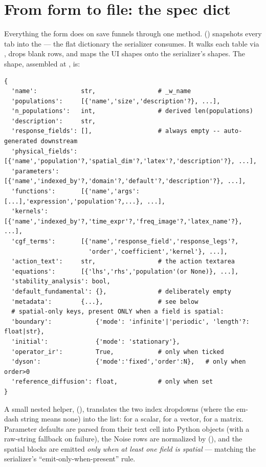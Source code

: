 \section{From form to file: the spec dict}

Everything the form does on save funnels through one method. 
() snapshots every tab into the  ---
the flat dictionary the serializer consumes. It walks each table via
, drops blank rows, and maps the UI shapes onto the serializer's
shapes. The shape, assembled at , is:

\begin{lstlisting}
{
  'name':            str,                 # _w_name
  'populations':     [{'name','size','description'?}, ...],
  'n_populations':   int,                 # derived len(populations)
  'description':     str,
  'response_fields': [],                  # always empty -- auto-generated downstream
  'physical_fields': [{'name','population'?,'spatial_dim'?,'latex'?,'description'?}, ...],
  'parameters':      [{'name','indexed_by'?,'domain'?,'default'?,'description'?}, ...],
  'functions':       [{'name','args':[...],'expression','population'?,...}, ...],
  'kernels':         [{'name','indexed_by'?,'time_expr'?,'freq_image'?,'latex_name'?}, ...],
  'cgf_terms':       [{'name','response_field','response_legs'?,
                       'order','coefficient','kernel'}, ...],
  'action_text':     str,                 # the action textarea
  'equations':       [{'lhs','rhs','population'(or None)}, ...],
  'stability_analysis': bool,
  'default_fundamental': {},              # deliberately empty
  'metadata':        {...},               # see below
  # spatial-only keys, present ONLY when a field is spatial:
  'boundary':            {'mode': 'infinite'|'periodic', 'length'?: float|str},
  'initial':             {'mode': 'stationary'},
  'operator_ir':         True,            # only when ticked
  'dyson':               {'mode':'fixed','order':N},   # only when order>0
  'reference_diffusion': float,           # only when set
}
\end{lstlisting}

A small nested helper, 
(), translates the two index dropdowns (where
the em-dash string means none) into the  list: \code{[]} for a scalar,
\code{[pop]} for a vector,  for a matrix. Parameter defaults are
parsed from their text cell into Python objects (with a raw-string fallback on
failure), the Noise rows are normalized by 
(), and the spatial blocks are emitted \emph{only
when at least one field is spatial} --- matching the serializer's
``emit-only-when-present'' rule.

